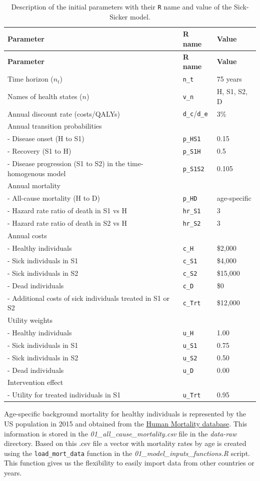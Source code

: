\documentclass[]{book}
\begin{document}
\begin{longtable}[]{@{}lll@{}}
\caption{\label{tab:parameters} Description of the initial parameters with their \texttt{R} name and value of the Sick-Sicker model.}\tabularnewline
\toprule
\textbf{Parameter} & \textbf{R name} & \textbf{Value}\tabularnewline
\midrule
\endfirsthead
\toprule
\textbf{Parameter} & \textbf{R name} & \textbf{Value}\tabularnewline
\midrule
\endhead
Time horizon (\(n_t\)) & \texttt{n\_t} & 75 years\tabularnewline
Names of health states (\(n\)) & \texttt{v\_n} & H, S1, S2, D\tabularnewline
Annual discount rate (costs/QALYs) & \texttt{d\_c}/\texttt{d\_e} & 3\%\tabularnewline
Annual transition probabilities & &\tabularnewline
- Disease onset (H to S1) & \texttt{p\_HS1} & 0.15\tabularnewline
- Recovery (S1 to H) & \texttt{p\_S1H} & 0.5\tabularnewline
- Disease progression (S1 to S2) in the time-homogenous model & \texttt{p\_S1S2} & 0.105\tabularnewline
Annual mortality & &\tabularnewline
- All-cause mortality (H to D) & \texttt{p\_HD} & age-specific\tabularnewline
- Hazard rate ratio of death in S1 vs H & \texttt{hr\_S1} & 3\tabularnewline
- Hazard rate ratio of death in S2 vs H & \texttt{hr\_S2} & 3\tabularnewline
Annual costs & &\tabularnewline
- Healthy individuals & \texttt{c\_H} & \$2,000\tabularnewline
- Sick individuals in S1 & \texttt{c\_S1} & \$4,000\tabularnewline
- Sick individuals in S2 & \texttt{c\_S2} & \$15,000\tabularnewline
- Dead individuals & \texttt{c\_D} & \$0\tabularnewline
- Additional costs of sick individuals treated in S1 or S2 & \texttt{c\_Trt} & \$12,000\tabularnewline
Utility weights & &\tabularnewline
- Healthy individuals & \texttt{u\_H} & 1.00\tabularnewline
- Sick individuals in S1 & \texttt{u\_S1} & 0.75\tabularnewline
- Sick individuals in S2 & \texttt{u\_S2} & 0.50\tabularnewline
- Dead individuals & \texttt{u\_D} & 0.00\tabularnewline
Intervention effect & &\tabularnewline
- Utility for treated individuals in S1 & \texttt{u\_Trt} & 0.95\tabularnewline
\bottomrule
\end{longtable}

Age-specific background mortality for healthy individuals is represented by the US population in 2015 and obtained from the \href{https://www.mortality.org}{Human Mortality database}. This information is stored in the \emph{01\_all\_cause\_mortality.csv} file in the \emph{data-raw} directory. Based on this .csv file a vector with mortality rates by age is created using the \texttt{load\_mort\_data} function in the \emph{01\_model\_inputs\_functions.R} script. This function gives us the flexibility to easily import data from other countries or years.
\end{document}

